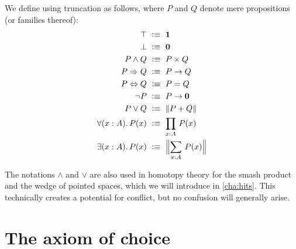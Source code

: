 \begin{defn} \label{defn:logical-notation}
  We define  using truncation as follows, where $P$ and $Q$ denote mere propositions (or families thereof):
  {\allowdisplaybreaks
  \begin{align*}
    \top            &\ \defeq \ \unit \\
    \bot            &\ \defeq \ \emptyt \\
    P \land Q       &\ \defeq \ P \times Q \\
    P \Rightarrow Q &\ \defeq \ P \to Q \\
    P \Leftrightarrow Q &\ \defeq \ P = Q \\
    \neg P          &\ \defeq \ P \to \emptyt \\
    P \lor Q        &\ \defeq \ \brck{P + Q} \\
    \fall{x : A} P(x) &\ \defeq \ \prd{x : A} P(x) \\
    \exis{x : A} P(x) &\ \defeq \ \Brck{\sm{x : A} P(x)}
  \end{align*}}
\end{defn}

The notations $\land$ and $\lor$ are also used in homotopy theory for the smash product and the wedge of pointed spaces, which we will introduce in \autoref{cha:hits}.
This technically creates a potential for conflict, but no confusion will generally arise.


\section{The axiom of choice}
\label{sec:axiom-choice}


